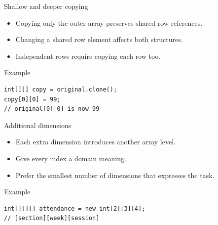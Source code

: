 \documentclass[10pt,aspectratio=169]{beamer}
\begin{document}
\begin{frame}[fragile,t]{Shallow and deeper copying}
\begin{itemize}
\item Copying only the outer array preserves shared row references.
\item Changing a shared row element affects both structures.
\item Independent rows require copying each row too.
\end{itemize}
\vspace{1mm}\begin{block}{Example}
\begin{lstlisting}
int[][] copy = original.clone();
copy[0][0] = 99;
// original[0][0] is now 99
\end{lstlisting}
\end{block}
\end{frame}

\begin{frame}[fragile,t]{Additional dimensions}
\begin{itemize}
\item Each extra dimension introduces another array level.
\item Give every index a domain meaning.
\item Prefer the smallest number of dimensions that expresses the task.
\end{itemize}
\vspace{1mm}\begin{block}{Example}
\begin{lstlisting}
int[][][] attendance = new int[2][3][4];
// [section][week][session]
\end{lstlisting}
\end{block}
\end{frame}
\end{document}
